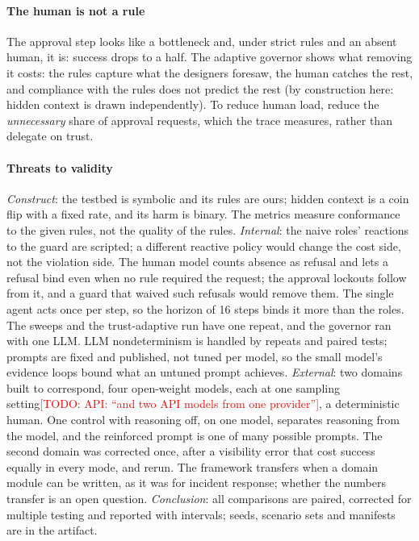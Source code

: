 \documentclass[10pt,conference]{IEEEtran}
\newcommand{\todo}[1]{\textcolor{red}{[TODO: #1]}}
\begin{document}
\paragraph{The human is not a rule}
The approval step looks like a bottleneck and, under strict rules and an absent human, it is: success drops to a half. The adaptive governor shows what removing it costs: the rules capture what the designers foresaw, the human catches the rest, and compliance with the rules does not predict the rest (by construction here: hidden context is drawn independently). To reduce human load, reduce the \emph{unnecessary} share of approval requests, which the trace measures, rather than delegate on trust.

\paragraph{Threats to validity}
\emph{Construct}: the testbed is symbolic and its rules are ours; hidden context is a coin flip with a fixed rate, and its harm is binary. The metrics measure conformance to the given rules, not the quality of the rules. \emph{Internal}: the naive roles' reactions to the guard are scripted; a different reactive policy would change the cost side, not the violation side. The human model counts absence as refusal and lets a refusal bind even when no rule required the request; the approval lockouts follow from it, and a guard that waived such refusals would remove them. The single agent acts once per step, so the horizon of 16 steps binds it more than the roles. The sweeps and the trust-adaptive run have one repeat, and the governor ran with one LLM. LLM nondeterminism is handled by repeats and paired tests; prompts are fixed and published, not tuned per model, so the small model's evidence loops bound what an untuned prompt achieves. \emph{External}: two domains built to correspond, four open-weight models, each at one sampling setting\todo{API: ``and two API models from one provider''}, a deterministic human. One control with reasoning off, on one model, separates reasoning from the model, and the reinforced prompt is one of many possible prompts. The second domain was corrected once, after a visibility error that cost success equally in every mode, and rerun. The framework transfers when a domain module can be written, as it was for incident response; whether the numbers transfer is an open question. \emph{Conclusion}: all comparisons are paired, corrected for multiple testing and reported with intervals; seeds, scenario sets and manifests are in the artifact.
\end{document}
